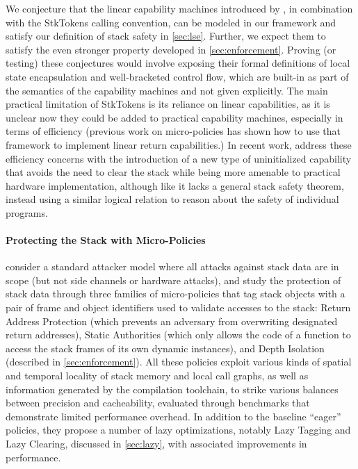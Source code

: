 \documentclass[acmsmall,review,anonymous]{acmart}\settopmatter{printfolios=true,printccs=false,printacmref=false}
\begin{document}
We conjecture that the linear capability machines introduced by
\citep{Skorstengaard+19}, in combination with the StkTokens calling convention,
can be modeled in our framework and satisfy our definition of stack safety in
\cref{sec:lse}. Further, we expect them to satisfy the even stronger
property developed in \cref{sec:enforcement}. Proving (or testing) these conjectures would
involve exposing their formal definitions of local state encapsulation and
well-bracketed control flow, which are built-in as part of the
semantics of the capability machines and not given explicitly.
The main practical limitation of StkTokens
is its reliance on linear capabilities, as it is unclear now they could be added
to practical capability machines, especially in terms of efficiency (previous
work on micro-policies \citep{yannis-report} has shown how to use that framework
to implement linear return capabilities.)
%
In recent work, \citet{Georges+21} address these efficiency concerns
with the introduction of a new type of uninitialized capability that
avoids the need to clear the stack while being more amenable to
practical hardware implementation, although like
\citet{Skorstengaard+19b} it lacks a general stack safety theorem,
instead using a similar logical relation to reason about the safety of
individual programs.

\paragraph{Protecting the Stack with Micro-Policies}
%
\citet{DBLP:conf/sp/RoesslerD18} consider a standard attacker model where all
attacks against stack data are in scope (but not side channels or hardware
attacks), and study the protection of stack data through three families of
micro-policies that tag stack objects with a pair of frame and object identifiers
used to validate accesses to the stack: Return Address Protection (which
prevents an adversary from overwriting designated return addresses), Static
Authorities (which only allows the code of a function to access the stack frames
of its own dynamic instances), and Depth Isolation (described in
\cref{sec:enforcement}). All these policies exploit various kinds of spatial and
temporal locality of stack memory and local call graphs, as well as information
generated by the compilation toolchain, to strike various balances between
precision and cacheability, evaluated through benchmarks that demonstrate
limited performance overhead. In addition to the baseline ``eager'' policies,
they propose a number of lazy optimizations, notably Lazy Tagging and Lazy
Clearing, discussed in \cref{sec:lazy}, with associated improvements in
performance.
\end{document}
